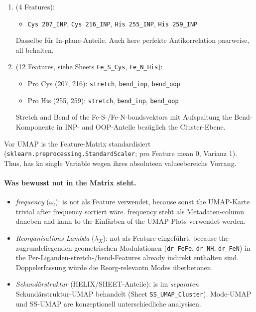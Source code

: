 \documentclass[11pt,a4paper,twoside]{article}
\theoremstyle{remark}
\begin{document}
\begin{enumerate}
  \item[\textbf{Liganden INP-Anteile}] (4 Features):
        \begin{itemize}\setlength{\itemsep}{0pt}
          \item \texttt{Cys 207\_INP}, \texttt{Cys 216\_INP},
                \texttt{His 255\_INP}, \texttt{His 259\_INP}
        \end{itemize}
        Dasselbe f\"ur In-plane-Anteile. Auch here perfekte
        Antikorrelation paarweise, all behalten.

  \item[\textbf{Pro-Liganden-atom-Bewegungen}] (12 Features, siehe
        Sheets \texttt{Fe\_S\_Cys}, \texttt{Fe\_N\_His}):
        \begin{itemize}\setlength{\itemsep}{0pt}
          \item Pro Cys (207, 216): \texttt{stretch},
                \texttt{bend\_inp}, \texttt{bend\_oop}
          \item Pro His (255, 259): \texttt{stretch},
                \texttt{bend\_inp}, \texttt{bend\_oop}
        \end{itemize}
        Stretch and Bend of the Fe-S-/Fe-N-bondsvektors mit
        Aufspaltung the Bend-Komponente in INP- and OOP-Anteile
        bez\"uglich the Cluster-Ebene.
\end{enumerate}

Vor UMAP is the Feature-Matrix standardisiert
(\texttt{sklearn.preprocessing.StandardScaler}; pro Feature mean
0, Varianz 1). Thus, has ka single Variable wegen ihres
absoluteen valueebereichs Vorrang.

\paragraph{Was bewusst not in the Matrix steht.}

\begin{itemize}
  \item \emph{frequency} ($\omega_l$): is not als Feature
        verwendet, because sonst the UMAP-Karte trivial after frequency
        sortiert w\"are. frequency steht als Metadaten-column daneben
        and kann to the Einf\"arben of the UMAP-Plots verwendet werden.

  \item \emph{Reorganisations-Lambda} ($\lambda_X$): not als Feature
        eingef\"uhrt, because the zugrundeliegenden geometrischen
        Modulationen (\texttt{dr\_FeFe}, \texttt{dr\_NH},
        \texttt{dr\_FeN}) in the Per-Liganden-stretch-/bend-Features
        already indirekt enthalten sind. Doppelerfassung w\"urde die
        Reorg-relevantn Modes \"uberbetonen.

  \item \emph{Sekund\"arstruktur} (HELIX/SHEET-Anteile): is im
        \emph{separaten} Sekund\"arstruktur-UMAP behandelt
        (Sheet \texttt{SS\_UMAP\_Cluster}). Mode-UMAP und
        SS-UMAP are konzeptionell unterschiedliche analysisen.
\end{itemize}
\end{document}
